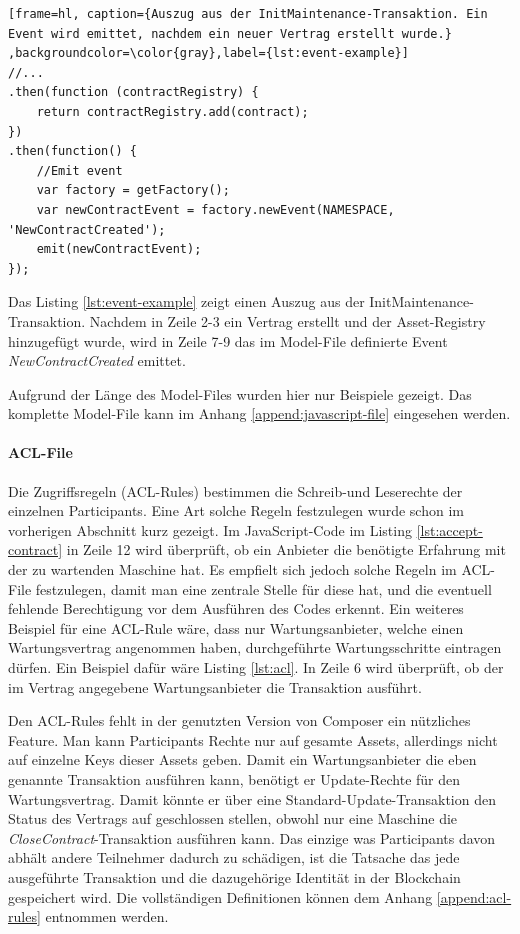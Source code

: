 \begin{lstfloat}
\begin{lstlisting}[frame=hl, caption={Auszug aus der InitMaintenance-Transaktion. Ein Event wird emittet, nachdem ein neuer Vertrag erstellt wurde.} ,backgroundcolor=\color{gray},label={lst:event-example}]
//...
.then(function (contractRegistry) {
    return contractRegistry.add(contract);
})
.then(function() {
    //Emit event
    var factory = getFactory();
    var newContractEvent = factory.newEvent(NAMESPACE, 'NewContractCreated');
    emit(newContractEvent);
});
\end{lstlisting} 
\end{lstfloat}

Das Listing \ref{lst:event-example} zeigt einen Auszug aus der InitMaintenance-Transaktion. Nachdem in Zeile 2-3 ein Vertrag erstellt und der Asset-Registry hinzugefügt wurde, wird in Zeile 7-9 das im Model-File definierte Event \textit{NewContractCreated} emittet.

Aufgrund der Länge des Model-Files wurden hier nur Beispiele gezeigt. Das komplette Model-File kann im Anhang \ref{append:javascript-file} eingesehen werden.

\paragraph{ACL-File}
Die Zugriffsregeln (ACL-Rules) bestimmen die Schreib-und Leserechte der einzelnen Participants. Eine Art solche Regeln festzulegen wurde schon im vorherigen Abschnitt kurz gezeigt. Im JavaScript-Code im Listing \ref{lst:accept-contract} in Zeile 12 wird überprüft, ob ein Anbieter die benötigte Erfahrung mit der zu wartenden Maschine hat. Es empfielt sich jedoch solche Regeln im ACL-File festzulegen, damit man eine zentrale Stelle für diese hat, und die eventuell fehlende Berechtigung vor dem Ausführen des Codes erkennt. Ein weiteres Beispiel für eine ACL-Rule wäre, dass nur Wartungsanbieter, welche einen Wartungsvertrag angenommen haben, durchgeführte Wartungsschritte eintragen dürfen. Ein Beispiel dafür wäre Listing \ref{lst:acl}. In Zeile 6 wird überprüft, ob der im Vertrag angegebene Wartungsanbieter die Transaktion ausführt.

Den ACL-Rules fehlt in der genutzten Version von Composer ein nützliches Feature. Man kann Participants Rechte nur auf gesamte Assets, allerdings nicht auf einzelne Keys dieser Assets geben. Damit ein Wartungsanbieter die eben genannte Transaktion ausführen kann, benötigt er Update-Rechte für den Wartungsvertrag. Damit könnte er über eine Standard-Update-Transaktion den Status des Vertrags auf geschlossen stellen, obwohl nur eine Maschine die \textit{CloseContract}-Transaktion ausführen kann. Das einzige was Participants davon abhält andere Teilnehmer dadurch zu schädigen, ist die Tatsache das jede ausgeführte Transaktion und die dazugehörige Identität in der Blockchain gespeichert wird. Die vollständigen Definitionen können dem Anhang \ref{append:acl-rules} entnommen werden.

